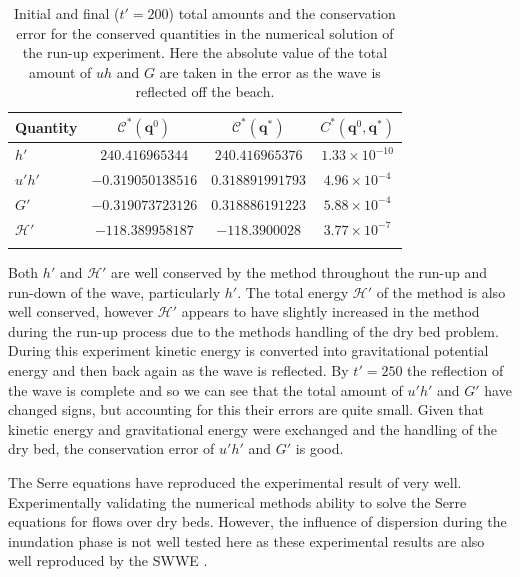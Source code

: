 \documentclass[times]{elsarticle}
\newcommand\T{\rule{0pt}{5ex }}       %
\newcommand\B{\rule[-4ex]{0pt}{4ex }} %
\newcommand{\vecn}[1]{\boldsymbol{#1}}
\begin{document}
\begin{table}
	\centering
	\begin{tabular}{l  c  c c}
		Quantity& $\mathcal{C}^*\left(\vecn{q}^0\right)$ & $\mathcal{C}^*\left(\vecn{q}^*\right)$ & ${C}^*\left(\vecn{q}^0,\vecn{q}^*\right)$  \B\\
		\hline 
		$h'$ & $240.416965344$ & $240.416965376$ & $1.33\times 10^{-10}$ \T \\
		$u'h'$ & $-0.319050138516$ & $0.318891991793$ & $4.96\times 10^{-4}$\\
		$G'$ & $-0.319073723126$ & $0.318886191223$ & $5.88\times 10^{-4}$\\
		$\mathcal{H}'$ & $-118.389958187$ & $-118.3900028$ & $3.77 \times 10^{-7}$ \B\\
		\hline \\
	\end{tabular}
	\caption{Initial and final ($t'=200$) total amounts and the conservation error for the conserved quantities in the numerical solution of the run-up experiment. Here the absolute value of the total amount of $uh$ and $G$ are taken in the error as the wave is reflected off the beach.}
	\label{tab:ConservationSynFEVM}
\end{table}

Both $h'$ and $\mathcal{H}'$ are well conserved by the method throughout the run-up and run-down of the wave, particularly $h'$. The total energy $\mathcal{H}'$ of the method is also well conserved, however $\mathcal{H}'$ appears to have slightly increased in the method during the run-up process due to the methods handling of the dry bed problem. During this experiment kinetic energy is converted into gravitational potential energy and then back again as the wave is reflected. By $t' = 250$ the reflection of the wave is complete and so we can see that the total amount of $u'h'$ and $G'$ have changed signs, but accounting for this their errors are quite small. Given that kinetic energy and gravitational energy were exchanged and the handling of the dry bed, the conservation error of $u'h'$ and $G'$ is good. 

The Serre equations have reproduced the experimental result of \citet{Synolakis-1987-523} very well. Experimentally validating the numerical methods ability to solve the Serre equations for flows over dry beds. However, the influence of dispersion during the inundation phase is not well tested here as these experimental results are also well reproduced by the SWWE \cite{Bollermann-etal-2011-271}.
\end{document}
